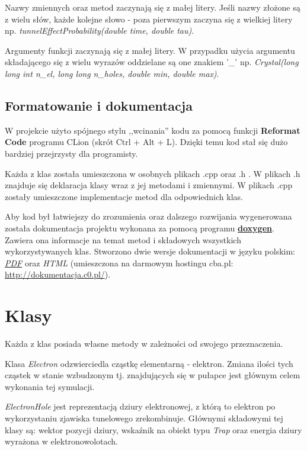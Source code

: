 Nazwy zmiennych oraz metod zaczynają się z małej litery. Jeśli nazwy złożone są z wielu słów, każde kolejne słowo - poza pierwszym zaczyna się z wielkiej litery np. \textit{tunnelEffectProbability(double time, double tau)}. 

Argumenty funkcji zaczynają się z małej litery. W przypadku użycia argumentu składającego się z wielu wyrazów oddzielane są one znakiem '\_'  np. \textit{Crystal(long long int n\_el, long long n\_holes, double min, double max)}.

\subsection{Formatowanie i dokumentacja}

W projekcie użyto spójnego stylu ,,wcinania'' kodu za pomocą funkcji \textbf{Reformat Code} programu CLion (skrót Ctrl + Alt + L). Dzięki temu kod stał się dużo bardziej przejrzysty dla programisty.

Każda z klas została umieszczona w osobnych plikach .cpp oraz .h . W plikach .h znajduje się deklaracja klasy wraz z jej metodami i zmiennymi. W plikach .cpp zostały umieszczone implementacje metod dla odpowiednich klas. 

Aby kod był łatwiejszy do zrozumienia oraz dalszego rozwijania wygenerowana została dokumentacja projektu wykonana za pomocą programu \hyperref[tech:doxy]{\textbf{doxygen}}. Zawiera ona informacje na temat metod i składowych wszystkich wykorzystywanych klas. Stworzono dwie wersje dokumentacji w języku polskim: \href{https://github.com/Sharkuu/Dissertation/blob/master/Dokumentacja\%20pdf/Dokumentacja.pdf}{\emph{PDF}} oraz \emph{HTML} (umieszczona na darmowym hostingu cba.pl: \url{http://dokumentacja.c0.pl/}).

\section{Klasy}
Każda z klas posiada własne metody w zależności od swojego przeznaczenia.

Klasa \textit{Electron} odzwierciedla cząstkę elementarną - elektron. Zmiana ilości tych cząstek w stanie wzbudzonym tj. znajdujących się w pułapce jest głównym celem wykonania tej symulacji.

\textit{ElectronHole} jest reprezentacją dziury elektronowej, z którą to elektron po wykorzystaniu zjawiska tunelowego zrekombinuje. Głównymi składowymi tej klasy są: wektor pozycji dziury, wskaźnik na obiekt typu \textit{Trap} oraz energia dziury wyrażona w elektronowolotach. 

